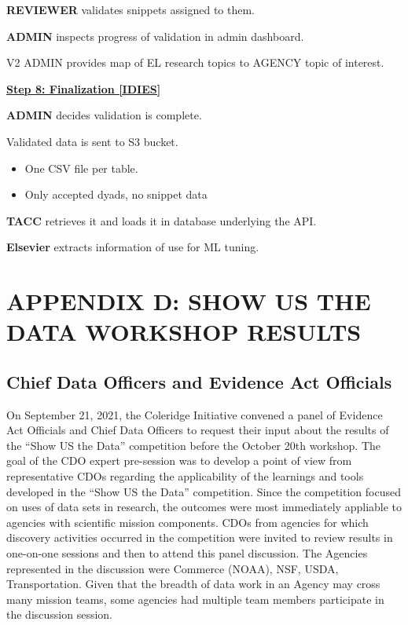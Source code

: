 \documentclass[titlepage, 11pt]{article}
\begin{document}
{\textbf{REVIEWER} validates snippets assigned to them.

\textbf{ADMIN} inspects progress of validation in admin dashboard.

V2 ADMIN provides map of EL research topics to AGENCY topic of interest.

\medskip
\underline{\textbf{Step 8: Finalization [IDIES]}}

\textbf{ADMIN} decides validation is complete.

Validated data is sent to S3 bucket.
\begin{itemize}
    \item One CSV file per table.
    \item Only accepted dyads, no snippet data
\end{itemize}

\textbf{TACC} retrieves it and loads it in database underlying the API.

\textbf{Elsevier} extracts information of use for ML tuning.

\newpage
\section*{APPENDIX D: SHOW US THE DATA WORKSHOP RESULTS}
\label{APPENDIXD}

\subsection*{Chief Data Officers and Evidence Act Officials} \label{subsec:CDOE}
On September 21, 2021, the Coleridge Initiative convened a panel of Evidence Act Officials and Chief Data Officers to request their input about the results of the “Show US the Data” competition before the October 20th workshop.  The goal of the CDO expert pre-session was to develop a point of view from representative CDOs regarding the applicability of the learnings and tools developed in the “Show US the Data” competition.   Since the competition focused on uses of data sets in research, the outcomes were most immediately appliable to agencies with scientific mission components.   CDOs from agencies for which discovery activities occurred in the competition were invited to review results in one-on-one sessions and then to attend this panel discussion.  The Agencies represented in the discussion were Commerce (NOAA), NSF, USDA, Transportation.   Given that the breadth of data work in an Agency may cross many mission teams, some agencies had multiple team members participate in the discussion session.

}
\end{document}
